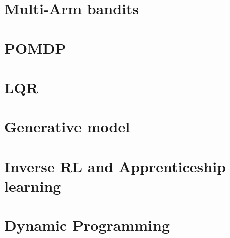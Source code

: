 \documentclass[12pt]{book}
\begin{document}
\chapter{ Multi-Arm bandits}
\label{chapter:MAB}




\chapter{POMDP}
\label{chapter:POMDP}


\chapter{LQR}
\label{chapter:LQR}


\chapter{Generative model}
\label{chapter:generative}


\chapter{Inverse RL and Apprenticeship learning}
\label{chapter:IRL}


\appendix

\chapter{Dynamic Programming}
\label{chapter:dp}



%

%
%
\end{document}
